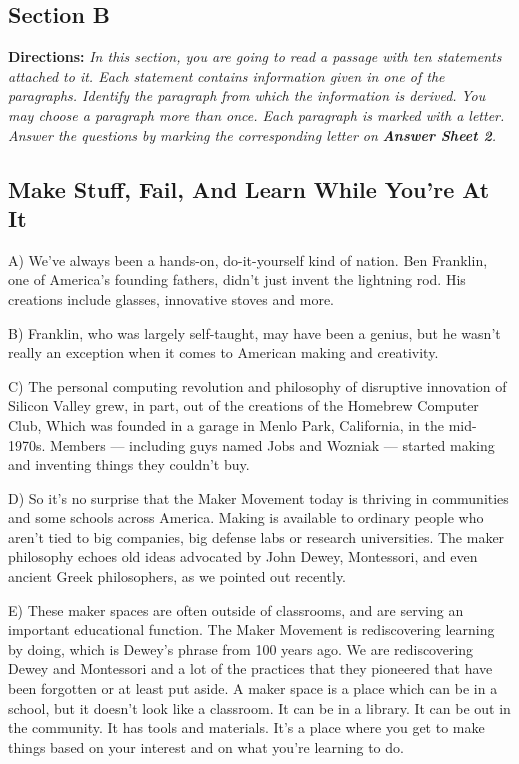 \documentclass[UTF8,11pt]{ctexart}
\begin{document}
\subsection*{\textbf{Section B}}


\textbf{Directions:}\textit{ In this section, you are going to read a passage with ten statements attached to it. Each statement} \textit{contains information given in one of the paragraphs. Identify the paragraph from which the information is derived.} \textit{You may choose a paragraph more than once. Each paragraph is marked with a letter. Answer the questions by} \textit{marking the corresponding letter on}\textbf{\textit{ Answer Sheet 2}}\textit{.}


\subsection*{\textbf{Make Stuff, Fail, And Learn While You’re At It}}


A) We’ve always been a hands-on, do-it-yourself kind of nation. Ben Franklin, one of America’s founding fathers, didn’t just invent the lightning rod. His creations include glasses, innovative stoves and more.


B) Franklin, who was largely self-taught, may have been a genius, but he wasn’t really an exception when it comes to American making and creativity.


C) The personal computing revolution and philosophy of disruptive innovation of Silicon Valley grew, in part, out of the creations of the Homebrew Computer Club, Which was founded in a garage in Menlo Park, California, in the mid-1970s. Members — including guys named Jobs and Wozniak — started making and inventing things they couldn’t buy.


D) So it’s no surprise that the Maker Movement today is thriving in communities and some schools across America. Making is available to ordinary people who aren’t tied to big companies, big defense labs or research universities. The maker philosophy echoes old ideas advocated by John Dewey, Montessori, and even ancient Greek philosophers, as we pointed out recently.


E) These maker spaces are often outside of classrooms, and are serving an important educational function. The Maker Movement is rediscovering learning by doing, which is Dewey’s phrase from 100 years ago. We are rediscovering Dewey and Montessori and a lot of the practices that they pioneered that have been forgotten or at least put aside. A maker space is a place which can be in a school, but it doesn’t look like a classroom. It can be in a library. It can be out in the community. It has tools and materials. It’s a place where you get to make things based on your interest and on what you’re learning to do.
\end{document}
